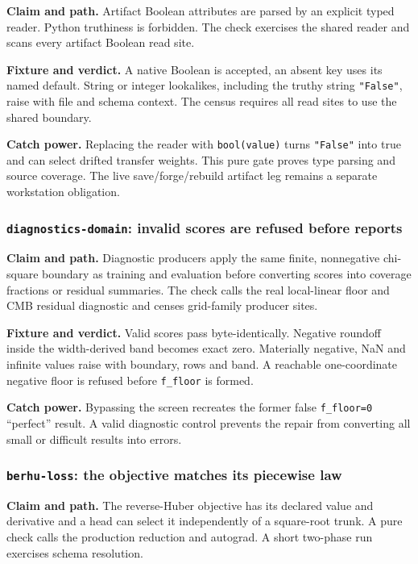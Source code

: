 \documentclass[10pt,aps,prd,twocolumn,nofootinbib]{revtex4-2}
\newcommand{\code}[1]{\texttt{#1}}
\begin{document}
\textbf{Claim and path.}  Artifact Boolean attributes are parsed by an
explicit typed reader.  Python truthiness is forbidden.  The check exercises the shared
reader and scans every artifact Boolean read site.

\textbf{Fixture and verdict.}  A native Boolean is accepted, an absent key
uses its named default.  String or integer lookalikes, including the
truthy string \code{"False"}, raise with file and schema context.  The
census requires all read sites to use the shared boundary.

\textbf{Catch power.}  Replacing the reader with \code{bool(value)} turns
\code{"False"} into true and can select drifted transfer weights.  This
pure gate proves type parsing and source coverage.  The live save/forge/rebuild
artifact leg remains a separate workstation obligation.

\subsubsection{\code{diagnostics-domain}: invalid scores are refused before reports}

\textbf{Claim and path.}  Diagnostic producers apply the same finite,
nonnegative chi-square boundary as training and evaluation before converting
scores into coverage fractions or residual summaries.  The check calls the
real local-linear floor and CMB residual diagnostic and censes grid-family
producer sites.

\textbf{Fixture and verdict.}  Valid scores pass byte-identically.  Negative
roundoff inside the width-derived band becomes exact zero.  Materially negative,
NaN and infinite values raise with boundary, rows and band.  A reachable
one-coordinate negative floor is refused before \code{f\_floor} is formed.

\textbf{Catch power.}  Bypassing the screen recreates the former false
\code{f\_floor=0} ``perfect'' result.  A valid diagnostic control prevents the
repair from converting all small or difficult results into errors.

\subsubsection{\code{berhu-loss}: the objective matches its piecewise law}

\textbf{Claim and path.}  The reverse-Huber objective has its declared value
and derivative and a head can select it independently of a square-root
trunk.  A pure check calls the production reduction and autograd.  A short
two-phase run exercises schema resolution.
\end{document}
